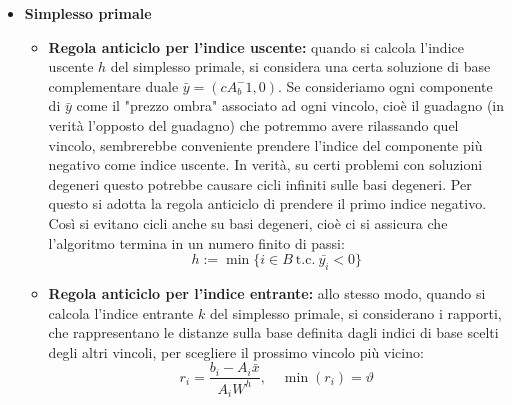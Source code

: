 \documentclass[a4paper,11pt]{article}
\begin{document}
\begin{itemize}
	\item \textbf{\textsf{Simplesso primale}}
		\begin{itemize}
			\item \textbf{Regola anticiclo per l'indice uscente:}
				quando si calcola l'indice uscente $h$ del simplesso primale, si considera una certa soluzione di base complementare duale $\bar{y} = \left( c A_b^-1, 0 \right)$.
				Se consideriamo ogni componente di $\bar{y}$ come il "prezzo ombra" associato ad ogni vincolo, cioè il guadagno (in verità l'opposto del guadagno) che potremmo avere rilassando quel vincolo, sembrerebbe conveniente prendere l'indice del componente più negativo come indice uscente.
				In verità, su certi problemi con soluzioni degeneri questo potrebbe causare cicli infiniti sulle basi degeneri.
				Per questo si adotta la regola anticiclo di prendere il primo indice negativo.
				Così si evitano cicli anche su basi degeneri, cioè ci si assicura che l'algoritmo termina in un numero finito di passi:
		$$
		h := \min\{ i \in B \ \text{t.c.} \ \bar{y_i} < 0 \}
		$$
			\item \textbf{Regola anticiclo per l'indice entrante:} 
				allo stesso modo, quando si calcola l'indice entrante $k$ del simplesso primale, si considerano i rapporti, che rappresentano le distanze sulla base definita dagli indici di base scelti degli altri vincoli, per scegliere il prossimo vincolo più vicino:
				$$
					r_i = \frac{b_i - A_i \bar{x}}{A_iW^h}, \quad \min(r_i) = \vartheta
				$$


\end{itemize}
\end{itemize}
\end{document}
